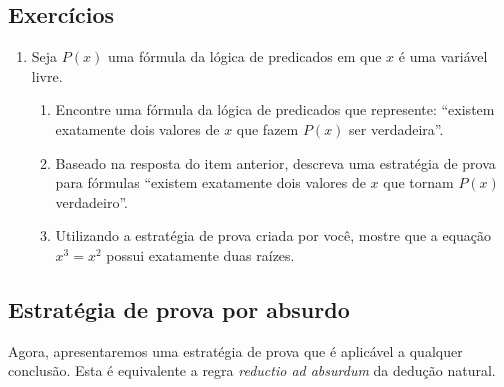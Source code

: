\subsection{Exercícios}

\begin{enumerate}
         \item Seja $P(x)$ uma f\'ormula da l\'ogica de predicados em que $x$ \'e uma vari\'avel livre.
       \begin{enumerate}
         \item Encontre uma f\'ormula da l\'ogica de predicados que represente: ``existem exatamente dois valores de $x$ que fazem $P(x)$
               ser verdadeira''.
         \item Baseado na resposta do item anterior, descreva uma estrat\'egia de prova para f\'ormulas ``existem exatamente dois valores de $x$
               que tornam $P(x)$ verdadeiro''.
         \item Utilizando a estrat\'egia de prova criada por voc\^e, mostre que a equa\c{c}\~ao $x^3 = x^2$ possui exatamente duas ra\'izes.
       \end{enumerate}
\end{enumerate}

\subsection{Estratégia de prova por absurdo}

Agora, apresentaremos uma estratégia de prova que é aplicável a
qualquer conclusão. Esta é equivalente a regra \emph{reductio ad
  absurdum} da dedução natural.

